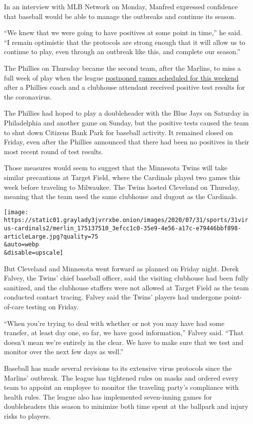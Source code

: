 In an interview with MLB Network on Monday, Manfred expressed confidence
that baseball would be able to manage the outbreaks and continue its
season.

``We knew that we were going to have positives at some point in time,''
he said. ``I remain optimistic that the protocols are strong enough that
it will allow us to continue to play, even through an outbreak like
this, and complete our season.''

The Phillies on Thursday became the second team, after the Marlins, to
miss a full week of play when the league
\href{https://www.nytimes3xbfgragh.onion/2020/07/30/sports/baseball/phillies-blue-jays-postponed-coronavirus.html}{postponed
games scheduled for this weekend} after a Phillies coach and a clubhouse
attendant received positive test results for the coronavirus.

The Phillies had hoped to play a doubleheader with the Blue Jays on
Saturday in Philadelphia and another game on Sunday, but the positive
tests caused the team to shut down Citizens Bank Park for baseball
activity. It remained closed on Friday, even after the Phillies
announced that there had been no positives in their most recent round of
test results.

Those measures would seem to suggest that the Minnesota Twins will take
similar precautions at Target Field, where the Cardinals played two
games this week before traveling to Milwaukee. The Twins hosted
Cleveland on Thursday, meaning that the team used the same clubhouse and
dugout as the Cardinals.

\texttt{[image: https://static01.graylady3jvrrxbe.onion/images/2020/07/31/sports/31virus-cardinals2/merlin\_175137510\_3efcc1c0-35e9-4e56-a17c-e79446bbf898-articleLarge.jpg?quality=75\\\&auto=webp\\\&disable=upscale]}

But Cleveland and Minnesota went forward as planned on Friday night.
Derek Falvey, the Twins' chief baseball officer, said the visiting
clubhouse had been fully sanitized, and the clubhouse staffers were not
allowed at Target Field as the team conducted contact tracing. Falvey
said the Twins' players had undergone point-of-care testing on Friday.

``When you're trying to deal with whether or not you may have had some
transfer, at least day one, so far, we have good information,'' Falvey
said. ``That doesn't mean we're entirely in the clear. We have to make
sure that we test and monitor over the next few days as well.''

Baseball has made several revisions to its extensive virus protocols
since the Marlins' outbreak. The league has tightened rules on masks and
ordered every team to appoint an employee to monitor the traveling
party's compliance with health rules. The league also has implemented
seven-inning games for doubleheaders this season to minimize both time
spent at the ballpark and injury risks to players.

